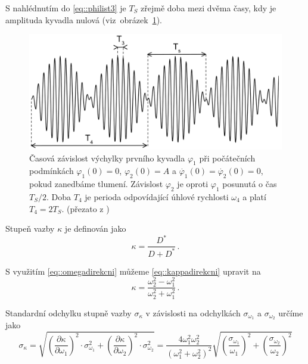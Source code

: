 S nahlédnutím do \eqref{eq::philist3} je $T_S$ zřejmě doba mezi dvěma časy, kdy je amplituda kyvadla nulová (viz~obrázek~\ref{obr::tretipripad}).

\begin{figure}[htbp]
\centering
\includegraphics[width=\textwidth-2cm]{graficos/ts}
\caption{Časová závislost výchylky prvního kyvadla $\varphi_1$ při počátečních podmínkách $\varphi_1(0)=0$, $\varphi_2(0)=A$ a $\dot{\varphi_1}(0)=\dot{\varphi_2}(0)=0$, pokud zanedbáme tlumení. Závislost $\varphi_2$ je oproti $\varphi_1$ posunutá o čas $T_S/2$. Doba $T_4$ je perioda odpovídající úhlové rychlosti $\omega_4$ a platí $T_4=2T_S$. (přezato z \cite{ZFP})}
\label{obr::tretipripad}
\end{figure}

Stupeň vazby $\kappa$ je definován jako \cite{ZFP}
\begin{equation} \label{eq::kappadirekcni}
\kappa = \frac{D^{\ast}}{D+D^{\ast}} \,.
\end{equation} 

S využitím \eqref{eq::omegadirekcni} můžeme \eqref{eq::kappadirekcni} upravit na
\begin{equation}
\kappa = \frac{\omega_2^2-\omega_1^2}{\omega_2^2+\omega_1^2} \,.
\end{equation}

Standardní odchylku stupně vazby $\sigma_\kappa$ v závislosti na odchylkách $\sigma _{\omega_1}$ a $\sigma _{\omega_2}$ určíme jako
\begin{equation} \label{eq::odchylkakappa}
\sigma _\kappa = \sqrt{ \left( \frac{\partial \kappa}{\partial \omega_1} \right) ^2 \cdot \sigma_{\omega_1}^2    +   \left(  \frac{\partial \kappa}{\partial \omega_2}     \right)^2 \cdot \sigma_{\omega_2}^2    } = \frac{4 \omega_1^2 \omega_2^2}{ \left( \omega_1^2+\omega_2^2 \right) ^2} \sqrt{ \left( \frac{\sigma _{\omega_1}}{\omega_1}      \right)^2    +      \left( \frac{\sigma _{\omega_2}}{\omega_2}      \right)^2                   }
\end{equation}

